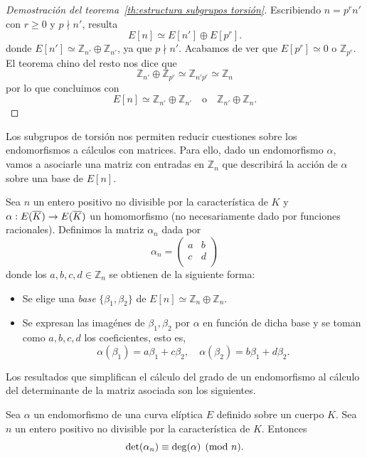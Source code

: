 \begin{proof}[Demostración del teorema~\ref{th:estructura subgrupos torsión}]
Escribiendo $n = p^r n'$ con $r \geq 0$ y $p \nmid n'$, resulta
$$
	E[n] \simeq E[n'] \oplus E[p^r].
$$
donde $E[n'] \simeq \mathbb{Z}_{n'} \oplus \mathbb{Z}_{n'}$, ya que $p \nmid n'$. Acabamos de ver que $E[p^r] \simeq 0$ o $\mathbb{Z}_{p^r}$. El teorema chino del resto nos dice que
$$
	\mathbb{Z}_{n'} \oplus \mathbb{Z}_{p^r} \simeq \mathbb{Z}_{n' p^r} \simeq \mathbb{Z}_{n}
$$
por lo que concluimos con
$$
	E[n] \simeq \mathbb{Z}_{n'} \oplus \mathbb{Z}_{n'} \quad \textrm{o} \quad  \mathbb{Z}_{n'} \oplus \mathbb{Z}_{n}.
$$
\end{proof}

Los subgrupos de torsión nos permiten reducir cuestiones sobre los endomorfismos a cálculos con matrices. Para ello, dado un endomorfismo $\alpha$, vamos a asociarle una matriz con entradas en $\mathbb{Z}_{n}$ que describirá la acción de $\alpha$ sobre una base de $E[n]$.

\begin{definicion}\label{def: matriz endomorfismo}
	Sea $n$ un entero positivo no divisible por la característica de $K$ y $\alpha: E(\overline{K}) \to E(\overline{K})$ un homomorfismo (no necesariamente dado por funciones racionales). Definimos la matriz $\alpha_n$ dada por
	$$
	\alpha_n =
	\begin{pmatrix}
		a & b \\
		c & d \\
	\end{pmatrix}
	$$
	donde los $a, b, c, d \in \mathbb{Z}_{n}$ se obtienen de la siguiente forma:
	\begin{itemize}
		\item Se elige una \emph{base} $\{ \beta_1, \beta_2 \}$ de $E[n] \simeq  \mathbb{Z}_{n} \oplus  \mathbb{Z}_{n}$.
		\item Se expresan las imagénes de $\beta_1, \beta_2$ por $\alpha$ en función de dicha base y se toman como $a, b, c, d$ los coeficientes, esto es,
		$$
			\alpha(\beta_1) = a \beta_1 + c \beta_2, \quad
			\alpha(\beta_2) = b \beta_1 + d \beta_2.
		$$
	\end{itemize}
\end{definicion}

Los resultados que simplifican el cálculo del grado de un endomorfismo al cálculo del determinante de la matriz asociada son los siguientes.

\begin{proposicion}\label{pp: relacion grado de un endomorfismo y el determinante}
	Sea $\alpha$ un endomorfismo de una curva elíptica $E$ definido sobre un cuerpo $K$. Sea $n$ un entero positivo no divisible por la característica de $K$. Entonces
	$$
		\det(\alpha_n) \equiv \deg(\alpha) \pmod{n}.
	$$
\end{proposicion}

